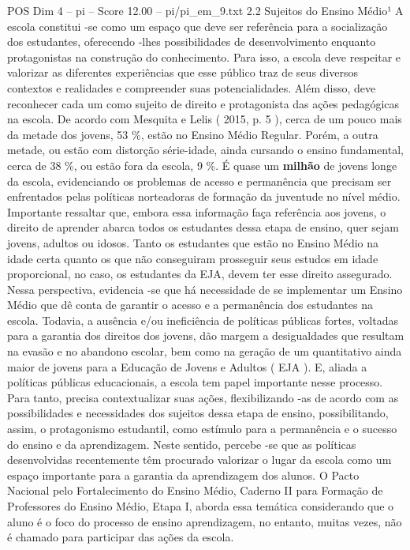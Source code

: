 \begin{textsample}{POS Dim 4 – pi – Score 12.00 – pi/pi\_em\_9.txt}  \label{ex:f4_pos_123}
2.2 Sujeitos do Ensino Médio¹ A escola constitui -se como um espaço que deve ser referência para a socialização dos estudantes, oferecendo -lhes possibilidades de desenvolvimento enquanto protagonistas na construção do conhecimento.
Para isso, a escola deve respeitar e valorizar as diferentes experiências que esse público traz de seus diversos contextos e realidades e compreender suas potencialidades.
Além disso, deve reconhecer cada um como sujeito de direito e protagonista das ações pedagógicas na escola.
De acordo com Mesquita e Lelis ( 2015, p. 5 ), cerca de um pouco mais da metade dos jovens, 53 \%, estão no Ensino Médio Regular.
Porém, a outra metade, ou estão com distorção série-idade, ainda cursando o ensino fundamental, cerca de 38 \%, ou estão fora da escola, 9 \%.
É quase um \textbf{milhão} de jovens longe da escola, evidenciando os problemas de acesso e permanência que precisam ser enfrentados pelas políticas norteadoras de formação da juventude no nível médio.
Importante ressaltar que, embora essa informação faça referência aos jovens, o direito de aprender abarca todos os estudantes dessa etapa de ensino, quer sejam jovens, adultos ou idosos.
Tanto os estudantes que estão no Ensino Médio na idade certa quanto os que não conseguiram prosseguir seus estudos em idade proporcional, no caso, os estudantes da EJA, devem ter esse direito assegurado.
Nessa perspectiva, evidencia -se que há necessidade de se implementar um Ensino Médio que dê conta de garantir o acesso e a permanência dos estudantes na escola.
Todavia, a ausência e/ou ineficiência de políticas públicas fortes, voltadas para a garantia dos direitos dos jovens, dão margem a desigualdades que resultam na evasão e no abandono escolar, bem como na geração de um quantitativo ainda maior de jovens para a Educação de Jovens e Adultos ( EJA ).
E, aliada a políticas públicas educacionais, a escola tem papel importante nesse processo.
Para tanto, precisa contextualizar suas ações, flexibilizando -as de acordo com as possibilidades e necessidades dos sujeitos dessa etapa de ensino, possibilitando, assim, o protagonismo estudantil, como estímulo para a permanência e o sucesso do ensino e da aprendizagem.
Neste sentido, percebe -se que as políticas desenvolvidas recentemente têm procurado valorizar o lugar da escola como um espaço importante para a garantia da aprendizagem dos alunos.
O Pacto Nacional pelo Fortalecimento do Ensino Médio, Caderno II para Formação de Professores do Ensino Médio, Etapa I, aborda essa temática considerando que o aluno é o foco do processo de ensino aprendizagem, no entanto, muitas vezes, não é chamado para participar das ações da escola.

\end{textsample}
